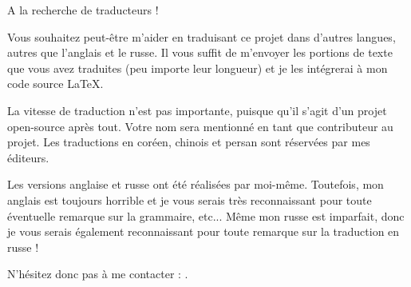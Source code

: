 \vspace*{\fill}

\Huge A la recherche de traducteurs !

\normalsize

\bigskip
\bigskip
\bigskip

Vous souhaitez peut-être m'aider en traduisant ce projet dans d'autres langues, autres que l'anglais et le russe.
Il vous suffit de m'envoyer les portions de texte que vous avez traduites (peu importe leur longueur) et je les intégrerai à mon code source LaTeX.

\iffalse
Pour ceux qui n'ont pas peur de TeX : \href{https://github.com/dennis714/RE-for-beginners/blob/master/Translation.md}{lire ici}.
Pour ceux qui en ont peur, vous pouvez également tout simplement ouvrir le fichier PDF dans OpenOffice et progressivement traduire chaque phrase.
Je ferai un copier/coller de votre travail vers mon code source LaTeX.
Il existe encore un meilleur moyen : d'après mon expérience, vous pouvez gagner en motivation en traduisant de petits morceaux de mon livre et en les postant sur votre blog (ou vos blogs).
Je peux publier ici les URLs vers vos publications et également sur mon Twitter (\href{http://twitter.com/yurichev}{@yurichev}).
\fi

La vitesse de traduction n'est pas importante, puisque qu'il s'agit d'un projet open-source après tout.
Votre nom sera mentionné en tant que contributeur au projet.
Les traductions en coréen, chinois et persan sont réservées par mes éditeurs.

Les versions anglaise et russe ont été réalisées par moi-même.
Toutefois, mon anglais est toujours horrible et je vous serais très reconnaissant pour toute éventuelle remarque sur la grammaire, etc...
Même mon russe est imparfait, donc je vous serais également reconnaissant pour toute remarque sur la traduction en russe !%

N'hésitez donc pas à me contacter : \GTT{\EMAIL}.

\vspace*{\fill}
\vfill
